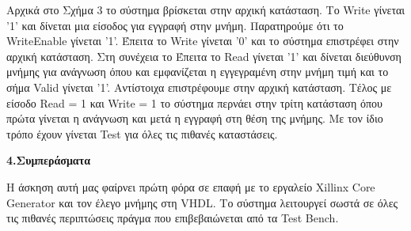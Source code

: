 \documentclass{article}
\begin{document}
\vspace{0.5cm}
\begin{justify}
\hspace{1.5em}
Αρχικά στο Σχήμα 3 το σύστημα βρίσκεται στην αρχική κατάσταση. Το Write γίνεται '1' και δίνεται μια είσοδος για εγγραφή στην μνήμη. Παρατηρούμε ότι το WriteEnable γίνεται '1'. Έπειτα το Write γίνεται '0' και το σύστημα επιστρέφει στην αρχική κατάσταση. Στη συνέχεια το Έπειτα το  Read γίνεται '1' και δίνεται διεύθυνση μνήμης για ανάγνωση όπου και εμφανίζεται η εγγεγραμένη στην μνήμη τιμή και το σήμα Valid γίνεται '1'. Αντίστοιχα επιστρέφουμε στην αρχική κατάσταση. Τέλος με είσοδο Read = 1 και Write = 1 το σύστημα περνάει στην τρίτη κατάσταση όπου πρώτα γίνεται η ανάγνωση και μετά η εγγραφή στη θέση της μνήμης. Με τον ίδιο τρόπο έχουν γίνεται Test για όλες τις πιθανές καταστάσεις.
    
\end{justify}

\vspace{0.5cm}

{ \large \bfseries 4.Συμπεράσματα}\\ %
\begin{justify}
Η άσκηση αυτή μας φαίρνει πρώτη φόρα σε επαφή με το εργαλείο Xillinx Core Generator και τον έλεγο μνήμης στη VHDL. Το σύστημα λειτουργεί σωστά σε όλες τις πιθανές περιπτώσεις πράγμα που επιβεβαιώνεται από τα Test Bench.

\end{justify}
\end{document}

